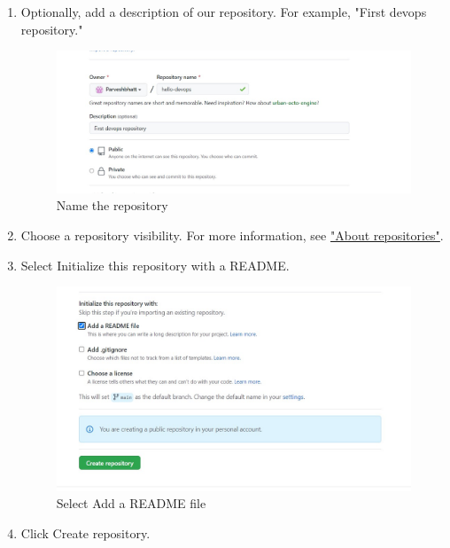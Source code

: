 \documentclass[12pt]{article}
\begin{document}
\begin{enumerate}
\item Optionally, add a description of our repository. For example, "First devops repository."

\begin{figure}[H]
\centering
\includegraphics[scale=0.8]{p3three}
\caption{Name the repository}
\label{p3three}
\vspace{0.6\baselineskip}
\end{figure}

\item Choose a repository visibility. For more information, see \href{https://docs.github.com/en/repositories/creating-and-managing-repositories/about-repositories}{"About repositories"}.

\item Select Initialize this repository with a README.
\begin{figure}[H]
\centering
\includegraphics[scale=0.8]{p3four}
\caption{Select Add a README file}
\label{p3four}
\vspace{0.6\baselineskip}
\end{figure}

\item Click Create repository.

\end{enumerate}
\end{document}
